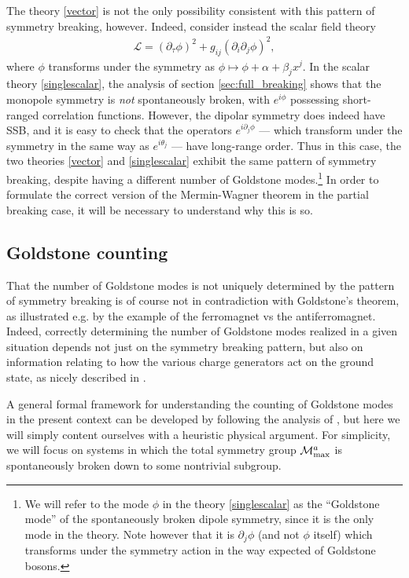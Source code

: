 \documentclass[pra,aps,twocolumn, amsfonts,amsmath,amssymb,nofootinbib,superscriptaddress]{revtex4-2}
\newcommand{\p}{\partial}
\renewcommand{\t}{\theta}
\newcommand{\mcm}{\mathcal{M}}
\begin{document}
The theory \eqref{vector} is not the only possibility consistent with this pattern of symmetry breaking, however. Indeed, consider instead the scalar field theory 
\begin{align}
\label{singlescalar}    \mathcal{L} = (\partial_\tau\phi)^2 + g_{ij} (\partial_i\partial_j\phi)^2, \end{align}
where $\phi$ transforms under the symmetry as $\phi \mapsto \phi + \alpha + \beta_jx^j$. 
 In the scalar theory \eqref{singlescalar}, the analysis of section \ref{sec:full_breaking} shows that the monopole symmetry is {\it not} spontaneously broken, with $e^{i\phi}$ possessing short-ranged correlation functions. However, the dipolar symmetry does indeed have SSB, and it is easy to check that the operators $e^{i\p_j\phi}$ --- which transform under the symmetry in the same way as $e^{i\t_j}$ --- have long-range order. Thus in this case, the two theories \eqref{vector} and \eqref{singlescalar} exhibit the same pattern of symmetry breaking, despite having a different number of Goldstone modes.\footnote{We will refer to the mode $\phi$ in the theory \eqref{singlescalar} as the ``Goldstone mode'' of the spontaneously broken dipole symmetry, since it is the only mode in the theory. Note however that it is $\p_j\phi$ (and not $\phi$ itself) which transforms under the symmetry action in the way expected of Goldstone bosons.} In order to formulate the correct version of the Mermin-Wagner theorem in the partial breaking case, it will be necessary to understand why this is so.  


\subsection{Goldstone counting} \label{sub:subgroup}

That the number of Goldstone modes is not uniquely determined by the pattern of symmetry breaking is of course not in contradiction with Goldstone's theorem, as illustrated e.g. by the example of the ferromagnet vs the antiferromagnet. Indeed, correctly determining the number of Goldstone modes realized in a given situation depends not just on the symmetry breaking pattern, but also on information relating to how the various charge generators act on the ground state, as nicely described in \cite{watanabe2013redundancies}.

A general formal framework for understanding the counting of Goldstone modes in the present context can be developed by following the analysis of \cite{watanabe2013redundancies}, but here we will simply content ourselves with a heuristic physical argument. For simplicity, we will focus on systems in which the total symmetry group $\mcm_{\rm max}^a$ is spontaneously broken down to some nontrivial subgroup. 
\end{document}
